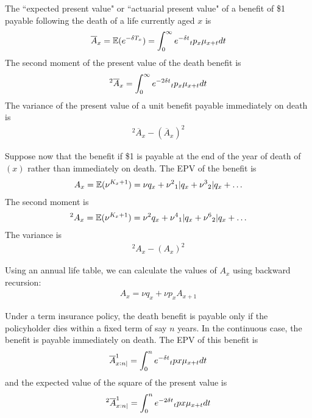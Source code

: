\documentclass[hidelinks, 12pt]{article}
\theoremstyle{mydefstyle}
\theoremstyle{mythmstyle}
\begin{document}
The ``expected present value" or ``actuarial present value" of a benefit of \$1 payable following the death of a life currently aged $x$ is
\begin{gather*}
\overline{A}_x = \mathbb{E}(e^{-\delta T_x}) = \int_0^{\infty} e^{-\delta t} \hspace{0mm}_tp_x \mu_{x+t} dt
\end{gather*}
The second moment of the present value of the death benefit is
\begin{gather*}
^2\overline{A}_x = \int_0^{\infty} e^{-2\delta t} \hspace{0mm}_tp_x \mu_{x+t} dt
\end{gather*}
The variance of the present value of a unit benefit payable immediately on death is
\begin{gather*}
^2\overline{A}_x - (\overline{A}_x)^2
\end{gather*}

Suppose now that the benefit if \$1 is payable at the end of the year of death of $(x)$ rather than immediately on death. The EPV of the benefit is
\begin{gather*}
A_x = \mathbb{E}(\nu^{K_x + 1}) = \nu q_x + \nu^2 \hspace{0mm}_1\vert q_x + \nu^3 \hspace{0mm} _2\vert q_x + \dots
\end{gather*}
The second moment is
\begin{gather*}
^2A_x = \mathbb{E}(\nu^{K_x + 1}) = \nu^2 q_x + \nu^4 \hspace{0mm}_1\vert q_x + \nu^6 \hspace{0mm} _2\vert q_x + \dots
\end{gather*}
The variance is
\begin{gather*}
^2A_x - (A_x)^2
\end{gather*}

Using an annual life table, we can calculate the values of $A_x$ using backward recursion:
\begin{gather*}
A_x = \nu q_x + \nu p_x A_{x+1}
\end{gather*}

Under a term insurance policy, the death benefit is payable only if the policyholder dies within a fixed term of say $n$ years. In the continuous case, the benefit is payable immediately on death. The EPV of this benefit is
\begin{gather*}
\overline{A}_{x:n|}^1 = \int_0^n e^{-\delta t} \hspace{0mm}_tpx \mu_{x+t} dt
\end{gather*}
and the expected value of the square of the present value is
\begin{gather*}
\hspace{0mm}^2\overline{A}_{x:n|}^1 = \int_0^n e^{-2\delta t} \hspace{0mm}_tpx \mu_{x+t} dt
\end{gather*}
\end{document}
